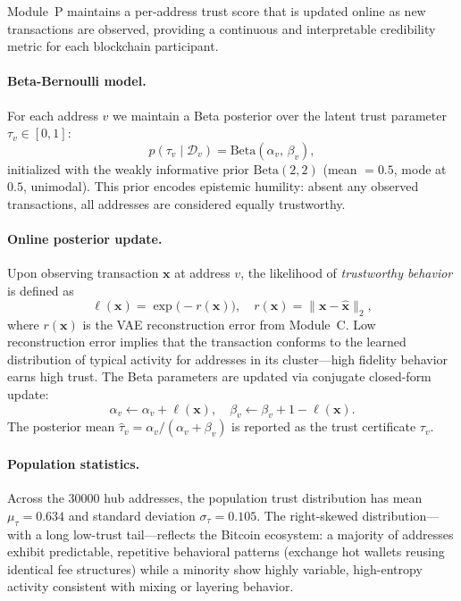 Module~P maintains a per-address trust score that is updated online as new
transactions are observed, providing a continuous and interpretable
credibility metric for each blockchain participant.

\paragraph{Beta-Bernoulli model.}
For each address $v$ we maintain a Beta posterior over the latent trust
parameter $\tau_v \in [0,1]$:
\begin{equation}
  p(\tau_v \mid \mathcal{D}_v)
    = \mathrm{Beta}\!\left(\alpha_v,\, \beta_v\right),
  \label{eq:beta_posterior}
\end{equation}
initialized with the weakly informative prior
$\mathrm{Beta}(2, 2)$ (mean $= 0.5$, mode at $0.5$, unimodal).
This prior encodes epistemic humility: absent any observed transactions, all
addresses are considered equally trustworthy.

\paragraph{Online posterior update.}
Upon observing transaction $\mathbf{x}$ at address $v$, the likelihood
of \emph{trustworthy behavior} is defined as
\begin{equation}
  \ell(\mathbf{x}) = \exp\!\bigl(-r(\mathbf{x})\bigr),
  \quad r(\mathbf{x}) = \|\mathbf{x} - \hat{\mathbf{x}}\|_2,
  \label{eq:likelihood}
\end{equation}
where $r(\mathbf{x})$ is the VAE reconstruction error from Module~C.
Low reconstruction error implies that the transaction conforms to the learned
distribution of typical activity for addresses in its cluster—high fidelity
behavior earns high trust.
The Beta parameters are updated via conjugate closed-form update:
\begin{equation}
  \alpha_v \leftarrow \alpha_v + \ell(\mathbf{x}), \quad
  \beta_v  \leftarrow \beta_v  + 1 - \ell(\mathbf{x}).
  \label{eq:beta_update}
\end{equation}
The posterior mean $\hat{\tau}_v = \alpha_v / (\alpha_v + \beta_v)$
is reported as the trust certificate $\tau_v$.

\paragraph{Population statistics.}
Across the \num{30000} hub addresses, the population trust distribution has
mean $\mu_\tau = 0.634$ and standard deviation $\sigma_\tau = 0.105$.
The right-skewed distribution—with a long low-trust tail—reflects the
Bitcoin ecosystem: a majority of addresses exhibit predictable, repetitive
behavioral patterns (exchange hot wallets reusing identical fee structures)
while a minority show highly variable, high-entropy activity consistent
with mixing or layering behavior.

